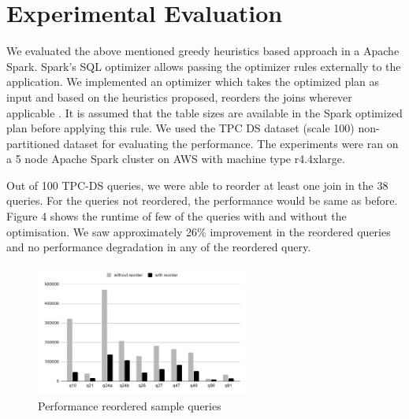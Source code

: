 \section{Experimental Evaluation}\label{sec:exp-evaluation}
We evaluated the above mentioned greedy heuristics based approach in a Apache Spark. Spark's SQL optimizer allows passing the optimizer rules externally to the application. We implemented an optimizer which takes the optimized plan as input and based on the heuristics proposed, reorders the joins wherever applicable . It is assumed that the table sizes are available in the Spark optimized plan before applying this rule. We used the TPC DS dataset (scale 100) non-partitioned dataset for evaluating the performance. The experiments were ran on a 5 node Apache Spark cluster on AWS with machine type r4.4xlarge.

Out of 100 TPC-DS queries, we were able to reorder at least one join in the 38 queries. For the queries not reordered, the performance would be same as before. Figure 4 shows the runtime of few of the queries with and without the optimisation. We saw approximately 26\% improvement in the reordered queries and no performance degradation in any of the reordered query.

\begin{figure}[ht]
\centerline{\includegraphics[width=7cm]{fig/chart.png}}
\caption{Performance reordered sample queries}
\label{performance_number}
\end{figure}